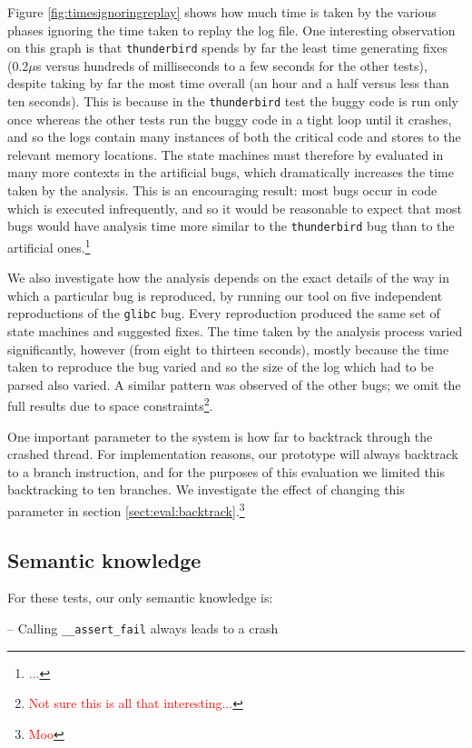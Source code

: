 \documentclass[10pt,twocolumn,preprint,natbib,authoryear]{sigplanconf}
\newcommand{\editorial}[1]{\textcolor{red}{\footnote{\textcolor{red}{#1}}}}
\begin{document}
Figure \ref{fig:timesignoringreplay} shows how much time is taken by
the various phases ignoring the time taken to replay the log file.
One interesting observation on this graph is that \verb|thunderbird|
spends by far the least time generating fixes (0.2$\mu{}$s versus
hundreds of milliseconds to a few seconds for the other tests),
despite taking by far the most time overall (an hour and a half versus
less than ten seconds).  This is because in the \verb|thunderbird|
test the buggy code is run only once whereas the other tests run the
buggy code in a tight loop until it crashes, and so the logs contain
many instances of both the critical code and stores to the relevant
memory locations.  The state machines must therefore by evaluated in
many more contexts in the artificial bugs, which dramatically
increases the time taken by the analysis.  This is an encouraging
result: most bugs occur in code which is executed infrequently, and so
it would be reasonable to expect that most bugs would have analysis
time more similar to the \verb|thunderbird| bug than to the artificial
ones.\editorial{...}

We also investigate how the analysis depends on the exact details of
the way in which a particular bug is reproduced, by running our tool
on five independent reproductions of the \verb|glibc| bug.  Every
reproduction produced the same set of state machines and suggested
fixes.  The time taken by the analysis process varied significantly,
however (from eight to thirteen seconds), mostly because the time
taken to reproduce the bug varied and so the size of the log which had
to be parsed also varied.  A similar pattern was observed of the other
bugs; we omit the full results due to space constraints\editorial{Not
  sure this is all that interesting...}.

One important parameter to the system is how far to backtrack through
the crashed thread.  For implementation reasons, our prototype will
always backtrack to a branch instruction, and for the purposes of this
evaluation we limited this backtracking to ten branches.  We
investigate the effect of changing this parameter in section
\ref{sect:eval:backtrack}.\editorial{Moo}

\subsection{Semantic knowledge}

For these tests, our only semantic knowledge is:

-- Calling \verb|__assert_fail| always leads to a crash
\end{document}
